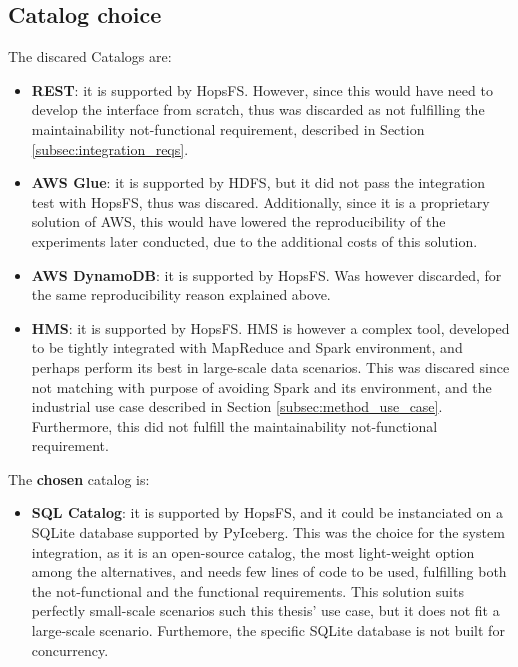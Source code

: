 \subsection{Catalog choice}
\label{subsec:integration_catalog_choice}
The discared Catalogs are:
\begin{itemize}
    \item \textbf{REST}: it is supported by \gls{HopsFS}. However, since this would have need to develop the interface from scratch, thus was discarded as not fulfilling the maintainability not-functional requirement, described in Section \ref{subsec:integration_reqs}.
    \item \textbf{\gls{AWS} Glue}: it is supported by \gls{HDFS}, but it did not pass the integration test with \gls{HopsFS}, thus was discared. Additionally, since it is a proprietary solution of \gls{AWS}, this would have lowered the reproducibility of the experiments later conducted, due to the additional costs of this solution.
    \item \textbf{\gls{AWS} DynamoDB}: it is supported by \gls{HopsFS}. Was however discarded, for the same reproducibility reason explained above.
    \item \textbf{\gls{HMS}}: it is supported by \gls{HopsFS}. \gls{HMS} is however a complex tool, developed to be tightly integrated with MapReduce and Spark environment, and perhaps perform its best in large-scale data scenarios. This was discared since not matching with purpose of avoiding Spark and its environment, and the industrial use case described in Section \ref{subsec:method_use_case}. Furthermore, this did not fulfill the maintainability not-functional requirement.
\end{itemize}
The \textbf{chosen} catalog is:
\begin{itemize}
    \item \textbf{SQL Catalog}: it is supported by \gls{HopsFS}, and it could be instanciated on a SQLite database supported by PyIceberg. This was the choice for the system integration, as it is an open-source catalog, the most light-weight option among the alternatives, and needs few lines of code to be used, fulfilling both the not-functional and the functional requirements. This solution suits perfectly small-scale scenarios such this thesis' use case, but it does not fit a large-scale scenario. Furthemore, the specific SQLite database is not built for concurrency.
\end{itemize}

